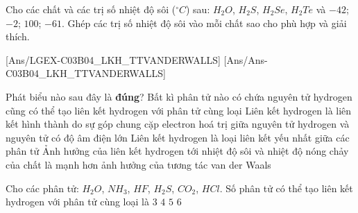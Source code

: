 \begin{bt}
	Cho các chất và các trị số nhiệt độ sôi ($^\circ C$) sau: $H_2O$, $H_2S$, $H_2Se$, $H_2Te$ và $-42$; $-2$; $100$; $-61$.
	Ghép các trị số nhiệt độ sôi vào mỗi chất sao cho phù hợp và giải thích.
\end{bt}

[Ans/LGEX-C03B04_LKH_TTVANDERWALLS]
[Ans/Ans-C03B04_LKH_TTVANDERWALLS]

\begin{ex}
	Phát biểu nào sau đây là \textbf{đúng}?
	\choice
	{Bất kì phân tử nào có chứa nguyên tử hydrogen cũng có thể tạo liên kết hydrogen với phân tử cùng loại}
	{Liên kết hydrogen là liên kết hình thành do sự góp chung cặp electron hoá trị giữa nguyên tử hydrogen và nguyên tử có độ âm điện lớn}
	{Liên kết hydrogen là loại liên kết yếu nhất giữa các phân tử}
	{\True Ảnh hưởng của liên kết hydrogen tới nhiệt độ sôi và nhiệt độ nóng chảy của chất là mạnh hơn ảnh hưởng của tương tác van der Waals}
	\loigiai{}
\end{ex}

\begin{ex}
	Cho các phân tử: $H_2O$, $NH_3$, $HF$, $H_2S$, $CO_2$, $HCl$. Số phân tử có thể tạo liên kết hydrogen với phân tử cùng loại là
	\choice
	{\True $3$}
	{$4$}
	{$5$}
	{$6$}
\end{ex}

